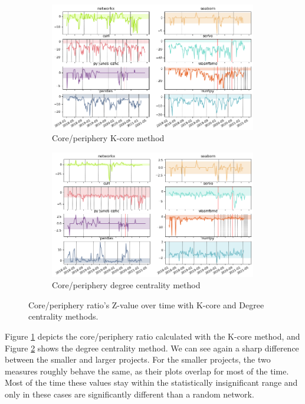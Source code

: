 \begin{figure}
    \centering
    \begin{subfigure}{0.99\textwidth}
        \centering
        \includegraphics[width=0.99\textwidth]{figures/qualitative/core_periphery/core_periphery_k_core.png}
        \caption{Core/periphery K-core method}
        \label{fig:cp-k-core}
    \end{subfigure}
    \begin{subfigure}{0.99\textwidth}
        \centering
        \includegraphics[width=0.99\textwidth]{figures/qualitative/core_periphery/core_periphery_degree.png}
        \caption{Core/periphery degree centrality method}
        \label{fig:cp-degree-centrality}
    \end{subfigure}
    \caption{Core/periphery ratio's Z-value over time with K-core and Degree centrality methods.}
    \label{fig:core-periphery}

\end{figure}

Figure \ref{fig:cp-k-core} depicts the core/periphery ratio calculated with the K-core method, and Figure \ref{fig:cp-degree-centrality} shows the degree centrality method. We can see again a sharp difference between the smaller and larger projects. For the smaller projects, the two measures roughly behave the same, as their plots overlap for most of the time. Most of the time these values stay within the statistically insignificant range and only in these cases are significantly different than a random network.

